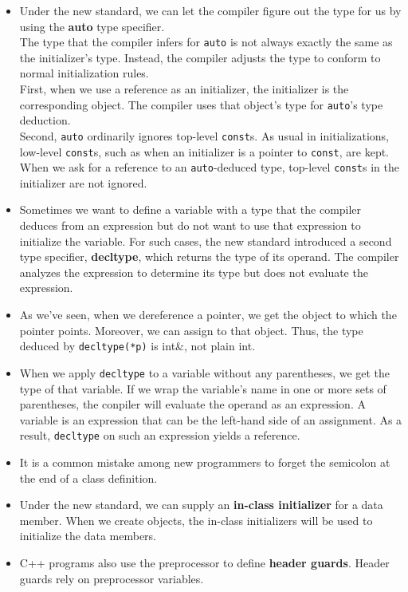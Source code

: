 \begin{itemize}
\item Under the new standard, we can let the compiler figure out the type for us by using the \textbf{auto} type specifier.\\The type that the compiler infers for \texttt{auto} is not always exactly the same as the initializer's type. Instead, the compiler adjusts the type to conform to normal initialization rules.\\First, when we use a reference as an initializer, the initializer is the corresponding object. The compiler uses that object's type for \texttt{auto}'s type deduction.\\Second, \texttt{auto} ordinarily ignores top-level \texttt{const}s. As usual in initializations, low-level \texttt{const}s, such as when an initializer is a pointer to \texttt{const}, are kept.\\When we ask for a reference to an \texttt{auto}-deduced type, top-level \texttt{const}s in the initializer are not ignored.

\item Sometimes we want to define a variable with a type that the compiler deduces from an expression but do not want to use that expression to initialize the variable. For such cases, the new standard introduced a second type specifier, \textbf{decltype}, which returns the type of its operand. The compiler analyzes the expression to determine its type but does not evaluate the expression.

\item As we've seen, when we dereference a pointer, we get the object to which the pointer points. Moreover, we can assign to that object. Thus, the type deduced by \texttt{decltype(*p)} is int\&, not plain int.

\item When we apply \texttt{decltype} to a variable without any parentheses, we get the type of that variable. If we wrap the variable's name in one or more sets of parentheses, the conpiler will evaluate the operand as an expression. A variable is an expression that can be the left-hand side of an assignment. As a result, \texttt{decltype} on such an expression yields a reference.

\item It is a common mistake among new programmers to forget the semicolon at the end of a class definition.

\item Under the new standard, we can supply an \textbf{in-class initializer} for a data member. When we create objects, the in-class initializers will be used to initialize the data members.

\item C++ programs also use the preprocessor to define \textbf{header guards}. Header guards rely on preprocessor variables.

\end{itemize}